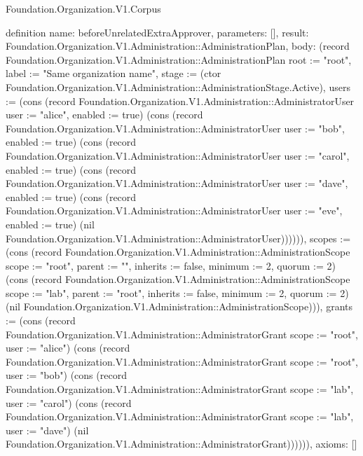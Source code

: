 \begin{lexlean}{Foundation.Organization.V1.Corpus}
\begin{semanticmodule}
definition{
  name: beforeUnrelatedExtraApprover,
  parameters: [],
  result: Foundation.Organization.V1.Administration::AdministrationPlan,
  body: (record Foundation.Organization.V1.Administration::AdministrationPlan {root := "root", label := "Same organization name", stage := (ctor Foundation.Organization.V1.Administration::AdministrationStage.Active), users := (cons (record Foundation.Organization.V1.Administration::AdministratorUser {user := "alice", enabled := true}) (cons (record Foundation.Organization.V1.Administration::AdministratorUser {user := "bob", enabled := true}) (cons (record Foundation.Organization.V1.Administration::AdministratorUser {user := "carol", enabled := true}) (cons (record Foundation.Organization.V1.Administration::AdministratorUser {user := "dave", enabled := true}) (cons (record Foundation.Organization.V1.Administration::AdministratorUser {user := "eve", enabled := true}) (nil Foundation.Organization.V1.Administration::AdministratorUser)))))), scopes := (cons (record Foundation.Organization.V1.Administration::AdministrationScope {scope := "root", parent := "", inherits := false, minimum := 2, quorum := 2}) (cons (record Foundation.Organization.V1.Administration::AdministrationScope {scope := "lab", parent := "root", inherits := false, minimum := 2, quorum := 2}) (nil Foundation.Organization.V1.Administration::AdministrationScope))), grants := (cons (record Foundation.Organization.V1.Administration::AdministratorGrant {scope := "root", user := "alice"}) (cons (record Foundation.Organization.V1.Administration::AdministratorGrant {scope := "root", user := "bob"}) (cons (record Foundation.Organization.V1.Administration::AdministratorGrant {scope := "lab", user := "carol"}) (cons (record Foundation.Organization.V1.Administration::AdministratorGrant {scope := "lab", user := "dave"}) (nil Foundation.Organization.V1.Administration::AdministratorGrant)))))}),
  axioms: []
}


\end{semanticmodule}
\end{lexlean}
